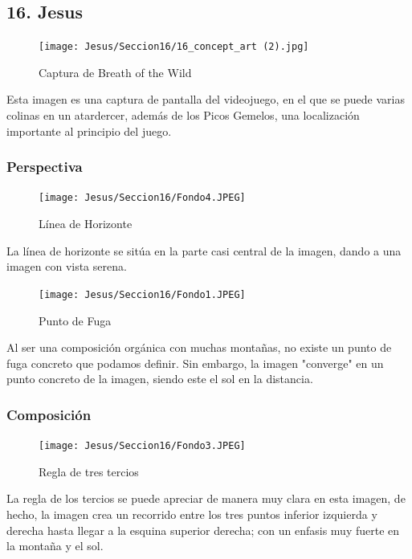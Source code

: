 \documentclass[12pt]{article}
\begin{document}

    \subsection{16. Jesus}
        \begin{figure}[H]
          \centering
          \texttt{[image: Jesus/Seccion16/16\_concept\_art (2).jpg]}
          \caption{Captura de Breath of the Wild}
        \end{figure}
        Esta imagen es una captura de pantalla del videojuego, en el que se puede varias colinas en un atardercer, además de los Picos Gemelos, una localización importante al principio del juego.

        \subsubsection{Perspectiva}
          \begin{figure}[H]
            \centering
            \texttt{[image: Jesus/Seccion16/Fondo4.JPEG]}
            \caption{Línea de Horizonte}
          \end{figure}
          La línea de horizonte se sitúa en la parte casi central de la imagen, dando a una imagen con vista serena.

          \begin{figure}[H]
            \centering
            \texttt{[image: Jesus/Seccion16/Fondo1.JPEG]}
            \caption{Punto de Fuga}
          \end{figure}
          Al ser una composición orgánica con muchas montañas, no existe un punto de fuga concreto que podamos definir. Sin embargo, la imagen "converge" en un punto concreto de la imagen, siendo este el sol en la distancia. 


        \subsubsection{Composición}
          \begin{figure}[H]
            \centering
            \texttt{[image: Jesus/Seccion16/Fondo3.JPEG]}
            \caption{Regla de tres tercios}
          \end{figure}

          La regla de los tercios se puede apreciar de manera muy clara en esta imagen, de hecho, la imagen crea un recorrido entre los tres puntos inferior izquierda y derecha hasta llegar a la esquina superior derecha; con un enfasis muy fuerte en la montaña y el sol.
\end{document}
